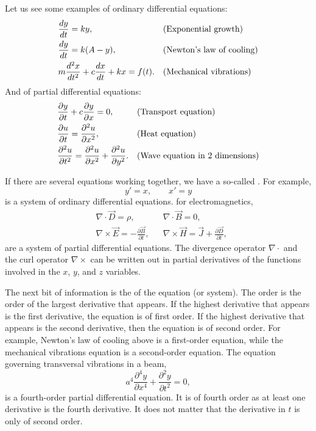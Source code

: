 Let us see some examples of ordinary differential equations:
\begin{align*}
& \frac{d y}{dt} = ky , & & \text{(Exponential growth\index{exponential growth})} \\
& \frac{d y}{dt} = k(A-y) , & & \text{(\myindex{Newton's law of cooling})} \\
& m \frac{d^2 x}{dt^2} + c \frac{dx}{dt} + kx = f(t) . & &
\text{(Mechanical vibrations\index{mechanical vibrations})}
\end{align*}
And of partial differential equations:
\begin{align*}
& \frac{\partial y}{\partial t} + c \frac{\partial y}{\partial x} = 0 , & &
\text{(Transport equation\index{transport equation})} \\
& \frac{\partial u}{\partial t} = \frac{\partial^2 u}{\partial x^2} , & &
\text{(Heat equation\index{heat equation})} \\
& \frac{\partial^2 u}{\partial t^2} = \frac{\partial^2 u}{\partial x^2} +
\frac{\partial^2 u}{\partial y^2} . & &
\text{(Wave equation in 2 dimensions\index{wave equation in 2 dimensions})}
\end{align*}

If there are several equations working together, we have a so-called
\emph{}.  For example,
\begin{equation*}
y' = x , \qquad x' = y
\end{equation*}
is a system of ordinary differential equations.
 for electromagnetics,
\begin{align*}
& \nabla \cdot \vec{D} = \rho, & & \nabla \cdot \vec{B} = 0 , \\
& \nabla \times \vec{E} = - \frac{\partial \vec{B}}{\partial t}, &
& \nabla \times \vec{H} = \vec{J} + \frac{\partial \vec{D}}{\partial t} ,
\end{align*}
are a system of partial differential equations.
The divergence operator $\nabla \cdot$ and the
curl operator $\nabla \times$ can be written out in partial derivatives of
the functions involved in the $x$, $y$, and $z$ variables.

\medskip

The next bit of information is the \emph{} of the
equation (or system).  The order is the order of the largest
derivative that appears.  If the highest derivative that appears is
the first derivative, the equation is of first order.  If the highest
derivative that appears is the second derivative, then the equation is of second
order.  For example, Newton's law of cooling above is a first-order
equation, while the mechanical vibrations equation is a second-order equation.
The equation governing transversal vibrations in a beam,
\begin{equation*}
a^4 \frac{\partial^4 y}{\partial x^4} + \frac{\partial^2 y}{\partial t^2} = 0,
\end{equation*}
is a fourth-order partial differential equation.  It is of
fourth order as at least one derivative is the fourth derivative.  It
does not matter that the derivative in $t$ is only of second order.

